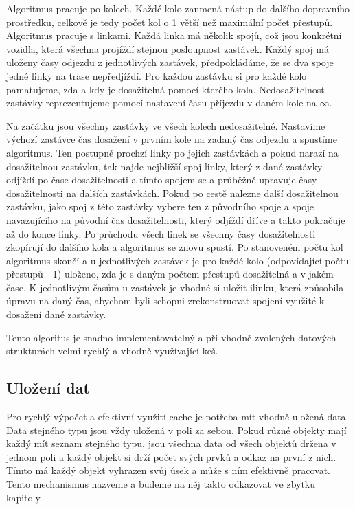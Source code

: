 Algoritmus pracuje po kolech. Každé kolo zanmená nástup do dalšího dopravního
prostředku, celkově je tedy počet kol o 1 větší než maximální počet přestupů.
Algoritmus pracuje s linkami. Každá linka má několik spojů, což jsou konkrétní
vozidla, která všechna projíždí stejnou posloupnost zastávek. Každý spoj má
uloženy časy odjezdu z jednotlivých zastávek, předpokládáme, že se dva spoje
jedné linky na trase nepředjíždí. Pro každou zastávku si pro každé kolo
pamatujeme, zda a kdy je dosažitelná pomocí kterého kola. Nedosažitelnost
zastávky reprezentujeme pomocí nastavení času příjezdu v daném kole na $\infty$.

Na začátku jsou všechny zastávky ve všech kolech nedosažitelné. Nastavíme
výchozí zastávce čas dosažení v prvním kole na zadaný čas odjezdu a spustíme
algoritmus. Ten postupně prochzí linky po jejich zastávkách a pokud narazí na
dosažitelnou zastávku, tak najde nejbližší spoj linky, který z dané zastávky
odjíždí po čase dosažitelnosti a tímto spojem se  a průběžně upravuje
časy dosažitelnosti na dalších zastávkách. Pokud po cestě nalezne další
dosažitelnou zastávku, jako spoj z této zastávky vybere ten z původního spoje a
spoje navazujícího na původní čas dosažitelnosti, který odjíždí dříve a takto
pokračuje až do konce linky. Po průchodu všech linek se všechny časy
dosažitelnosti zkopírují do dalšího kola a algoritmus se znovu spustí. Po
stanoveném počtu kol algoritmus skončí a u jednotlivých zastávek je pro každé
kolo (odpovídající počtu přestupů - 1) uloženo, zda je s daným počtem přestupů
dosažitelná a v jakém čase. K jednotlivým časům u zastávek je vhodné si uložit
ilinku, která způsobila úpravu na daný čas, abychom byli schopni zrekonstruovat
spojení využité k dosažení dané zastávky. 

Tento algoritus je snadno implementovatelný a při vhodně zvolených datových
strukturách velmi rychlý a vhodně využívající keš. 

\subsection{Uložení dat}
Pro rychlý výpočet a efektivní využití cache je potřeba mít vhodně uložená data.
Data stejného typu jsou vždy uložená v poli za sebou. Pokud různé objekty mají
každý mít seznam stejného typu, jsou všechna data od všech objektů držena v
jednom poli a každý objekt si drží počet svých prvků a odkaz na první z nich.
Tímto má každý objekt vyhrazen svůj úsek a může s ním efektivně pracovat. Tento
mechanismus nazveme  a budeme na něj takto odkazovat ve
zbytku kapitoly.

